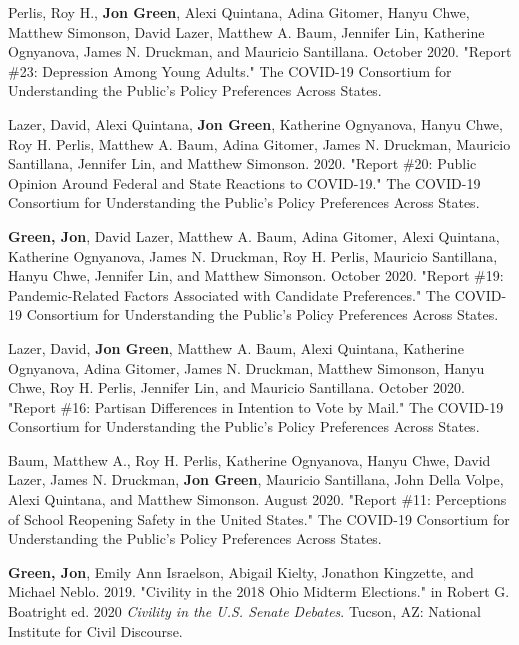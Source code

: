 \documentclass[letterpaper]{article}
\renewenvironment{itemize}{
  \begin{list}{}{
    \setlength{\leftmargin}{1.5em}
  }
}{
  \end{list}
}
\begin{document}
\begin{itemize}
\item Perlis, Roy H., \textbf{Jon Green}, Alexi Quintana, Adina Gitomer, Hanyu Chwe, Matthew Simonson, David Lazer, Matthew A. Baum, Jennifer Lin, Katherine Ognyanova, James N. Druckman, and Mauricio Santillana. October 2020. "Report \#23: Depression Among Young Adults." The COVID-19 Consortium for Understanding the Public’s Policy Preferences Across States.

\item Lazer, David, Alexi Quintana, \textbf{Jon Green}, Katherine Ognyanova, Hanyu Chwe, Roy H. Perlis, Matthew A. Baum, Adina Gitomer, James N. Druckman, Mauricio Santillana, Jennifer Lin, and Matthew Simonson. 2020. "Report \#20: Public Opinion Around Federal and State Reactions to COVID-19." The COVID-19 Consortium for Understanding the Public’s Policy Preferences Across States.

\item \textbf{Green, Jon}, David Lazer, Matthew A. Baum, Adina Gitomer, Alexi Quintana, Katherine Ognyanova, James N. Druckman, Roy H. Perlis, Mauricio Santillana, Hanyu Chwe, Jennifer Lin, and Matthew Simonson. October 2020. "Report \#19: Pandemic-Related Factors Associated with Candidate Preferences." The COVID-19 Consortium for Understanding the Public’s Policy Preferences Across States.

\item Lazer, David, \textbf{Jon Green}, Matthew A. Baum, Alexi Quintana, Katherine Ognyanova, Adina Gitomer, James N. Druckman, Matthew Simonson, Hanyu Chwe, Roy H. Perlis, Jennifer Lin, and Mauricio Santillana. October 2020. "Report \#16: Partisan Differences in Intention to Vote by Mail." The COVID-19 Consortium for Understanding the Public’s Policy Preferences Across States.

\item Baum, Matthew A., Roy H. Perlis, Katherine Ognyanova, Hanyu Chwe, David Lazer, James N. Druckman, \textbf{Jon Green}, Mauricio Santillana, John Della Volpe, Alexi Quintana, and Matthew Simonson. August 2020. "Report \#11: Perceptions of School Reopening Safety in the United States." The COVID-19 Consortium for Understanding the Public’s Policy Preferences Across States.

\item \textbf{Green, Jon}, Emily Ann Israelson, Abigail Kielty, Jonathon Kingzette, and Michael Neblo. 2019. "Civility in the 2018 Ohio Midterm Elections." in Robert G. Boatright ed. 2020 \textit{Civility in the U.S. Senate Debates}. Tucson, AZ: National Institute for Civil Discourse.


\end{itemize}
\end{document}
